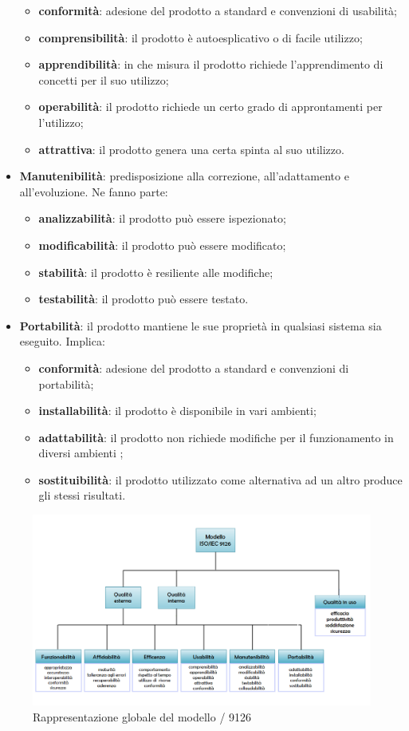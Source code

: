 \begin{itemize}
	\begin{itemize}
		\item \textbf{conformità}: adesione del prodotto a standard e convenzioni di usabilità;
		\item \textbf{comprensibilità}: il prodotto è autoesplicativo o di facile utilizzo;
		\item \textbf{apprendibilità}: in che misura il prodotto richiede l'apprendimento di concetti per il suo utilizzo;
		\item \textbf{operabilità}: il prodotto richiede un certo grado di approntamenti per l'utilizzo;
		\item \textbf{attrattiva}: il prodotto genera una certa spinta al suo utilizzo.
	\end{itemize}	
	\item \textbf{Manutenibilità}: predisposizione alla correzione, all'adattamento e all'evoluzione. Ne fanno parte: 
	\begin{itemize}
		\item \textbf{analizzabilità}: il prodotto può essere ispezionato;
		\item \textbf{modificabilità}: il prodotto può essere modificato;
		\item \textbf{stabilità}: il prodotto è resiliente alle modifiche;
		\item \textbf{testabilità}: il prodotto può essere testato.
	\end{itemize}
	\item \textbf{Portabilità}: il prodotto mantiene le sue proprietà in qualsiasi sistema sia eseguito. Implica:
	\begin{itemize}
		\item \textbf{conformità}: adesione del prodotto a standard e convenzioni di portabilità;
	\item \textbf{installabilità}: il prodotto è disponibile in vari ambienti;
	\item \textbf{adattabilità}: il prodotto non richiede modifiche per il funzionamento in diversi ambienti ;
	\item \textbf{sostituibilità}: il prodotto utilizzato come alternativa ad un altro produce gli stessi risultati.
	\end{itemize}
\end{itemize}
\begin{figure}[H]
	\centering
	\includegraphics[width=15cm]{iso9126}
	\caption{Rappresentazione globale del modello / 9126}
\end{figure}